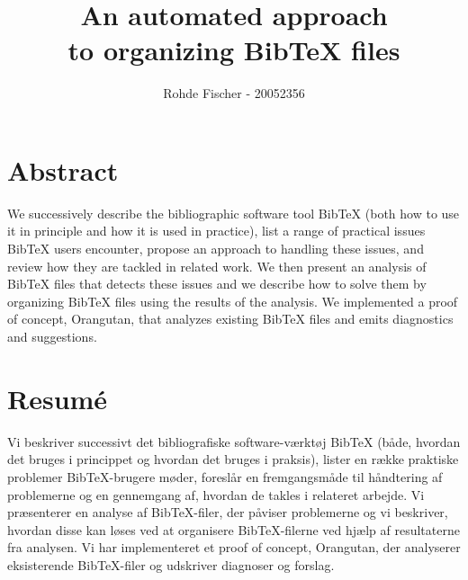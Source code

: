 \documentclass[twoside,11pt,openright,a4paper]{report}
\newcommand{\orangutan}{Orangutan}
\newcommand{\bibtex}{Bib{\TeX}}
\begin{document}
\pagestyle{empty}
\begin{titlepage}
\author{Rohde Fischer - 20052356}
\title{An automated approach\\to organizing {\bibtex} files}
\maketitle

\end{titlepage}


\pagestyle{plain}
\setcounter{page}{1}


\chapter*{Abstract}

We successively describe the bibliographic software tool {\bibtex}
(both how to use it in principle and how it is used in practice), list
a range of practical issues {\bibtex} users encounter, propose an
approach to hand\-ling these issues, and review how they are tackled
in related work.  We then present an analysis of {\bibtex} files that
detects these issues and we describe how to solve them by organizing
{\bibtex} files using the results of the analysis.  We implemented a
proof of concept, {\orangutan}, that analyzes existing {\bibtex} files
and emits diagnostics and suggestions.


\chapter*{Resumé}

Vi beskriver successivt det bibliografiske software-værktøj {\bibtex}
(både, hvordan det bruges i princippet og hvordan det bruges i
praksis), lister en række praktiske problemer {\bibtex}-brugere møder,
foreslår en fremgangsmåde til håndtering af problemerne og en
gennemgang af, hvordan de takles i relateret arbejde.  Vi præsenterer
en analyse af {\bibtex}-filer, der påviser problemerne og vi
beskriver, hvordan disse kan løses ved at organisere {\bibtex}-filerne
ved hjælp af resultaterne fra analysen.  Vi har implementeret et proof
of concept, {\orangutan}, der analyserer eksisterende {\bibtex}-filer
og udskriver diagnoser og forslag.
\end{document}
